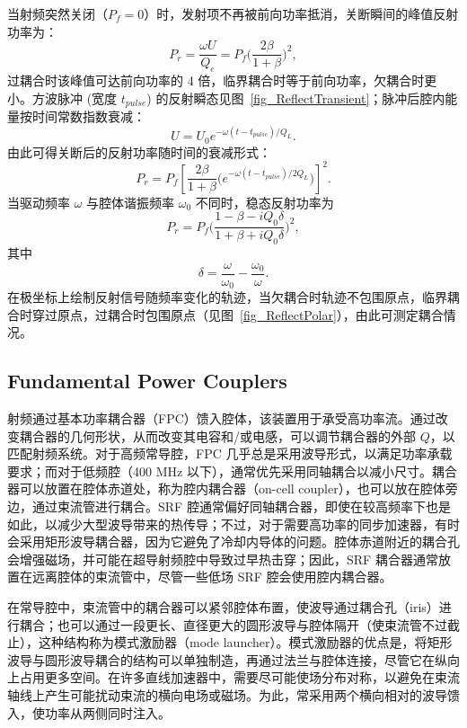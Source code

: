\documentclass{cernyrep}
\begin{document}
当射频突然关闭（$P_f=0$）时，发射项不再被前向功率抵消，关断瞬间的峰值反射功率为：
\begin{equation}
P_r= \frac{\omega U}{Q_e} = P_f \Bigg(  \frac{2 \beta}{1+ \beta} \Bigg)^2,
\end{equation}
过耦合时该峰值可达前向功率的 4 倍，临界耦合时等于前向功率，欠耦合时更小。方波脉冲 (宽度 $t_{pulse}$) 的反射瞬态见图~\ref{fig_ReflectTransient}；脉冲后腔内能量按时间常数指数衰减：
\begin{equation}
U = U_0 e^{-\omega (t-t_{pulse})/ Q_L}.
\end{equation}
由此可得关断后的反射功率随时间的衰减形式：
\begin{equation}
P_r= P_f \left[ \frac{2 \beta}{1+ \beta} \bigg( e^{-\omega (t-t_{pulse})/2 Q_L} \bigg) \right]^2.
\end{equation}
当驱动频率 $\omega$ 与腔体谐振频率 $\omega_0$ 不同时，稳态反射功率为~\cite{Padamsee}
\begin{equation}
P_r= P_f \Bigg(  \frac{1- \beta -i Q_0 \delta}{1+ \beta+i Q_0 \delta} \Bigg)^2,
\end{equation}
其中
\begin{equation}
    \delta = \frac{\omega}{\omega_0}- \frac{\omega_0}{\omega}.
\end{equation}
在极坐标上绘制反射信号随频率变化的轨迹，当欠耦合时轨迹不包围原点，临界耦合时穿过原点，过耦合时包围原点（见图~\ref{fig_ReflectPolar}），由此可测定耦合情况。

\subsection{Fundamental Power Couplers}
射频通过基本功率耦合器（FPC）馈入腔体，该装置用于承受高功率流。通过改变耦合器的几何形状，从而改变其电容和/或电感，可以调节耦合器的外部 $Q$，以匹配射频系统。对于高频常导腔，FPC 几乎总是采用波导形式，以满足功率承载要求；而对于低频腔（400 MHz 以下），通常优先采用同轴耦合以减小尺寸。耦合器可以放置在腔体赤道处，称为腔内耦合器（on-cell coupler），也可以放在腔体旁边，通过束流管进行耦合。SRF 腔通常偏好同轴耦合器，即使在较高频率下也是如此，以减少大型波导带来的热传导；不过，对于需要高功率的同步加速器，有时会采用矩形波导耦合器，因为它避免了冷却内导体的问题。腔体赤道附近的耦合孔会增强磁场，并可能在超导射频腔中导致过早热击穿；因此，SRF 耦合器通常放置在远离腔体的束流管中，尽管一些低场 SRF 腔会使用腔内耦合器。

在常导腔中，束流管中的耦合器可以紧邻腔体布置，使波导通过耦合孔（iris）进行耦合；也可以通过一段更长、直径更大的圆形波导与腔体隔开（使束流管不过截止），这种结构称为模式激励器（mode launcher）。模式激励器的优点是，将矩形波导与圆形波导耦合的结构可以单独制造，再通过法兰与腔体连接，尽管它在纵向上占用更多空间。在许多直线加速器中，需要尽可能使场分布对称，以避免在束流轴线上产生可能扰动束流的横向电场或磁场。为此，常采用两个横向相对的波导馈入，使功率从两侧同时注入。
\end{document}
